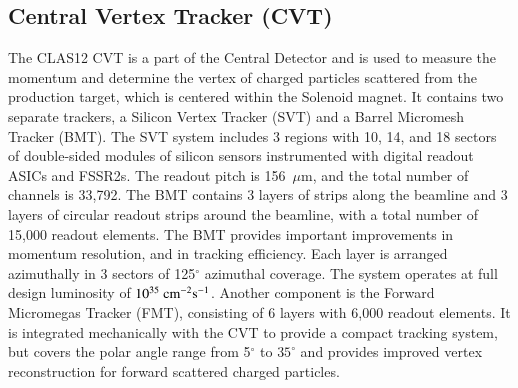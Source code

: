 \documentclass[final,3p,times,twocolumn,authoryear]{elsarticle}
\begin{document}
\subsection{\rm Central Vertex Tracker (CVT)}
The CLAS12 CVT is a part of the Central Detector and is used to measure the momentum and determine the vertex of charged particles scattered from the production target, which is centered within the Solenoid magnet. It contains two separate trackers, a Silicon Vertex Tracker (SVT) and a Barrel Micromesh Tracker  (BMT). The SVT system includes 3 regions with 10, 14, and 18 sectors of double-sided modules of silicon sensors instrumented with digital readout ASICs and FSSR2s. The readout pitch is 156~$\mu$m, and the total number of channels is 33,792.   
The BMT contains 3 layers of strips along the beamline and 3 layers of circular readout strips around the beamline, with a total number of 15,000 readout elements. The BMT provides important improvements in momentum resolution, and in tracking efficiency. Each layer is arranged azimuthally in 3 sectors of 125$^\circ$ azimuthal coverage. The system operates at full design luminosity of $10^{35}\rm~{cm^{-2}s^{-1}}$. 
Another component is the Forward Micromegas Tracker (FMT), consisting of 6 layers with 6,000 readout elements. It  is integrated mechanically with the CVT to provide a compact tracking system, but covers the polar angle range from 5$^\circ$ to $35^\circ$ and provides improved vertex reconstruction for forward scattered charged particles.
\end{document}
